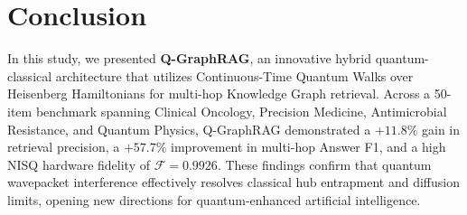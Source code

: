 \documentclass[runningheads]{llncs}
\begin{document}
\FloatBarrier
\section{Conclusion}
In this study, we presented \textbf{Q-GraphRAG}, an innovative hybrid quantum-classical architecture that utilizes Continuous-Time Quantum Walks over Heisenberg Hamiltonians for multi-hop Knowledge Graph retrieval. Across a 50-item benchmark spanning Clinical Oncology, Precision Medicine, Antimicrobial Resistance, and Quantum Physics, Q-GraphRAG demonstrated a $+11.8\%$ gain in retrieval precision, a $+57.7\%$ improvement in multi-hop Answer F1, and a high NISQ hardware fidelity of $\mathcal{F} = 0.9926$. These findings confirm that quantum wavepacket interference effectively resolves classical hub entrapment and diffusion limits, opening new directions for quantum-enhanced artificial intelligence.
\end{document}
